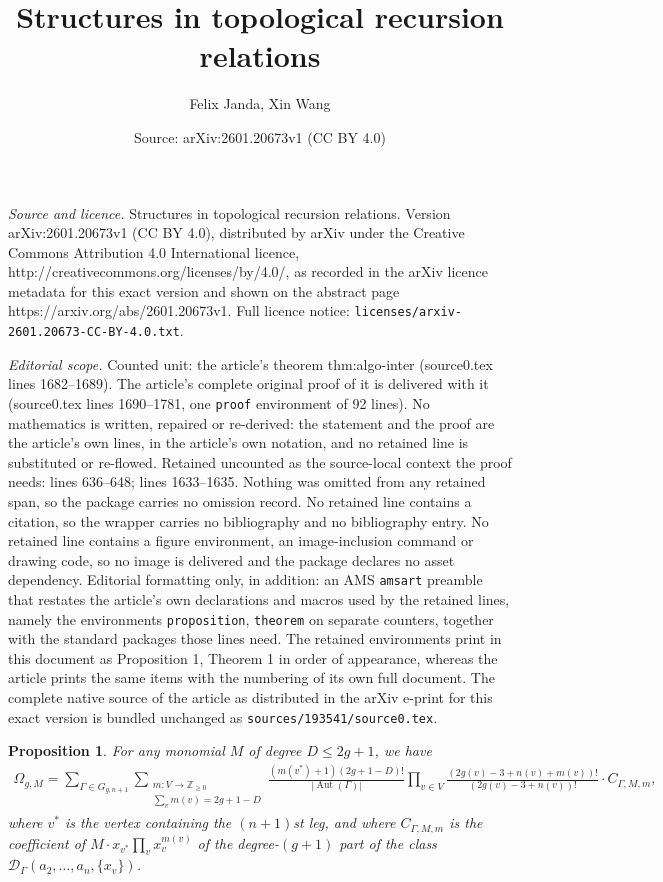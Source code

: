 \documentclass[10pt,a4paper]{amsart}
\title{Structures in topological recursion relations}
\author{Felix Janda, Xin Wang}
\date{Source: arXiv:2601.20673v1 (CC BY 4.0)}
\newtheorem{proposition}{Proposition}
\DeclareMathOperator{\Aut}{Aut}
\begin{document}
\maketitle

\noindent\emph{Source and licence.} Structures in topological recursion relations. Version arXiv:2601.20673v1 (CC BY 4.0), distributed by arXiv under the Creative Commons Attribution 4.0 International licence, http://creativecommons.org/licenses/by/4.0/, as recorded in the arXiv licence metadata for this exact version and shown on the abstract page https://arxiv.org/abs/2601.20673v1. Full licence notice: \texttt{licenses/arxiv-2601.20673-CC-BY-4.0.txt}.\par\smallskip

\noindent\textit{Editorial scope.} Counted unit: the article's theorem thm:algo-inter (source0.tex lines 1682--1689). The article's complete original proof of it is delivered with it (source0.tex lines 1690--1781, one \texttt{proof} environment of 92 lines). No mathematics is written, repaired or re-derived: the statement and the proof are the article's own lines, in the article's own notation, and no retained line is substituted or re-flowed.  Retained uncounted as the source-local context the proof needs: lines 636--648; lines 1633--1635.  Nothing was omitted from any retained span, so the package carries no omission record.  No retained line contains a citation, so the wrapper carries no bibliography and no bibliography entry.  No retained line contains a figure environment, an image-inclusion command or drawing code, so no image is delivered and the package declares no asset dependency.  Editorial formatting only, in addition: an AMS \texttt{amsart} preamble that restates the article's own declarations and macros used by the retained lines, namely the environments \texttt{proposition}, \texttt{theorem} on separate counters, together with the standard packages those lines need.  The retained environments print in this document as Proposition 1, Theorem 1 in order of appearance, whereas the article prints the same items with the numbering of its own full document.  The complete native source of the article as distributed in the arXiv e-print for this exact version is bundled unchanged as \texttt{sources/193541/source0.tex}.
\begin{proposition}\label{prop:omega_g,m-formula}
  For any monomial $M$ of degree $D \le 2g + 1$, we have
  \begin{align}\label{eqn:omega_g,m-formula}
    \Omega_{g, M}
    = \sum_{\Gamma\in G_{g,n+1}} \sum_{\substack{m\colon V \to \mathbb Z_{\ge 0} \\ \sum_v m(v) = 2g + 1 - D}}
    \frac{(m(v^*) + 1)(2g + 1 - D)!}{|\Aut(\Gamma)|}
    \prod_{v \in V} \frac{(2g(v) - 3 + n(v) + m(v))!}{(2g(v) - 3 + n(v))!} \cdot C_{\Gamma, M, m},
  \end{align}
  where $v^*$ is the vertex containing the $(n + 1)$st leg, and where
  $C_{\Gamma, M, m}$ is the coefficient of
  $M \cdot x_{v^*} \prod_v x_v^{m(v)}$ of the degree-$(g + 1)$ part of
  the class $\mathcal{D}_{\Gamma}(a_2, \dotsc, a_n, \{x_v\})$.
\end{proposition}
\end{document}
